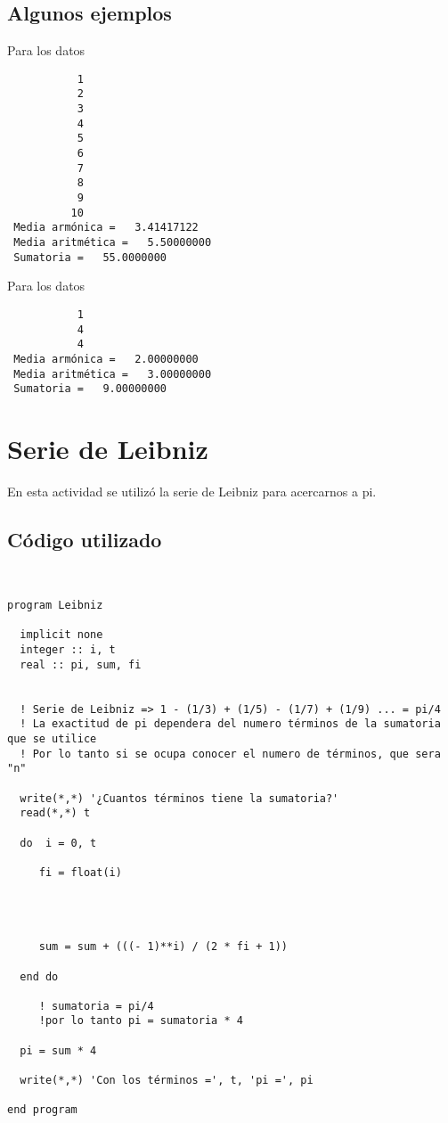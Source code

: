 \documentclass{article}
\begin{document}
\subsection{Algunos ejemplos}
Para los datos 
\begin{verbatim}
           1
           2
           3
           4
           5
           6
           7
           8
           9
          10
 Media armónica =   3.41417122    
 Media aritmética =   5.50000000    
 Sumatoria =   55.0000000    
\end{verbatim}
Para los datos
\begin{verbatim}
           1
           4
           4
 Media armónica =   2.00000000    
 Media aritmética =   3.00000000    
 Sumatoria =   9.00000000 
 \end{verbatim}
 
\section{Serie de Leibniz}
En esta actividad se utilizó la serie de Leibniz para acercarnos a pi.
\subsection{Código utilizado}
\begin{verbatim}


program Leibniz

  implicit none
  integer :: i, t
  real :: pi, sum, fi
  

  ! Serie de Leibniz => 1 - (1/3) + (1/5) - (1/7) + (1/9) ... = pi/4
  ! La exactitud de pi dependera del numero términos de la sumatoria que se utilice
  ! Por lo tanto si se ocupa conocer el numero de términos, que sera "n"

  write(*,*) '¿Cuantos términos tiene la sumatoria?'
  read(*,*) t
  
  do  i = 0, t
     
     fi = float(i)
     

     

     sum = sum + (((- 1)**i) / (2 * fi + 1))

  end do

     ! sumatoria = pi/4
     !por lo tanto pi = sumatoria * 4

  pi = sum * 4

  write(*,*) 'Con los términos =', t, 'pi =', pi

end program


\end{verbatim}
\end{document}
